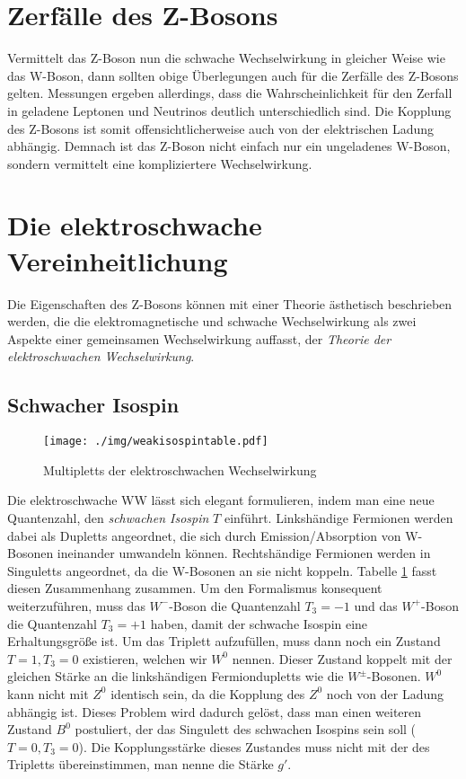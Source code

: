 \section{Zerfälle des Z-Bosons}
Vermittelt das Z-Boson nun die schwache Wechselwirkung in gleicher Weise wie das W-Boson,
dann sollten obige Überlegungen auch für die Zerfälle des Z-Bosons gelten.
Messungen ergeben allerdings, dass die Wahrscheinlichkeit für den Zerfall in geladene Leptonen und Neutrinos deutlich unterschiedlich sind.
Die Kopplung des Z-Bosons ist somit offensichtlicherweise auch von der elektrischen Ladung abhängig.
Demnach ist das Z-Boson nicht einfach nur ein ungeladenes W-Boson, sondern vermittelt eine kompliziertere Wechselwirkung.

\section{Die elektroschwache Vereinheitlichung}
Die Eigenschaften des Z-Bosons können mit einer Theorie ästhetisch beschrieben werden,
die die elektromagnetische und schwache Wechselwirkung als zwei Aspekte einer gemeinsamen Wechselwirkung auffasst, der \textit{Theorie der elektroschwachen Wechselwirkung}.

\subsection{Schwacher Isospin}
\begin{figure}
	\centering
	\texttt{[image: ./img/weakisospintable.pdf]}
	\caption{Multipletts der elektroschwachen Wechselwirkung}
	\label{fig:weakisospin}
\end{figure}
Die elektroschwache WW lässt sich elegant formulieren, indem man eine neue Quantenzahl, den \textit{schwachen Isospin} $T$ einführt.
Linkshändige Fermionen werden dabei als Dupletts angeordnet, die sich durch Emission/Absorption von W-Bosonen ineinander umwandeln können.
Rechtshändige Fermionen werden in Singuletts angeordnet, da die W-Bosonen an sie nicht koppeln.
Tabelle \ref{fig:weakisospin} fasst diesen Zusammenhang zusammen.
Um den Formalismus konsequent weiterzuführen, muss das $W^-$-Boson die Quantenzahl $T_3=-1$ und das $W^+$-Boson die Quantenzahl $T_3=+1$ haben, damit der schwache Isospin eine Erhaltungsgröße ist.
Um das Triplett aufzufüllen, muss dann noch ein Zustand $T=1, T_3=0$ existieren, welchen wir $W^0$ nennen.
Dieser Zustand koppelt mit der gleichen Stärke an die linkshändigen Fermiondupletts wie die $W^\pm$-Bosonen.
$W^0$ kann nicht mit $Z^0$ identisch sein, da die Kopplung des $Z^0$ noch von der Ladung abhängig ist.
Dieses Problem wird dadurch gelöst, dass man einen weiteren Zustand $B^0$ postuliert, der das Singulett des schwachen Isospins sein soll ($T=0, T_3=0$).
Die Kopplungsstärke dieses Zustandes muss nicht mit der des Tripletts übereinstimmen, man nenne die Stärke $g'$.


